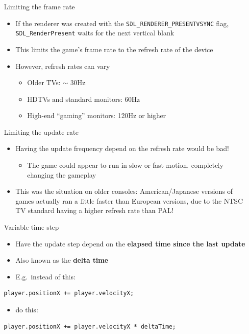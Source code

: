 \begin{frame}{Limiting the frame rate}
    \begin{itemize}
        \item If the renderer was created with the \lstinline{SDL_RENDERER_PRESENTVSYNC} flag,
            \lstinline{SDL_RenderPresent} waits for the next vertical blank \pause
        \item This limits the game's frame rate to the refresh rate of the device \pause
        \item However, refresh rates can vary \pause
            \begin{itemize}
                \item Older TVs: $\sim$ 30Hz
                \item HDTVs and standard monitors: 60Hz
                \item High-end ``gaming'' monitors: 120Hz or higher
            \end{itemize}
    \end{itemize}
\end{frame}

\begin{frame}{Limiting the update rate}
    \begin{itemize}
        \item Having the update frequency depend on the refresh rate would be bad! \pause
            \begin{itemize}
                \item The game could appear to run in slow or fast motion,
                    completely changing the gameplay \pause
            \end{itemize}
        \item This was the situation on older consoles:
            American/Japanese versions of games actually ran a little faster
            than European versions,
            due to the NTSC TV standard having a higher refresh rate than PAL!
    \end{itemize}
\end{frame}

\begin{frame}[fragile]{Variable time step}
    \begin{itemize}
        \item Have the update step depend on the \textbf{elapsed time since the last update} \pause
        \item Also known as the \textbf{delta time} \pause
        \item E.g.\ instead of this:
    \end{itemize}
    \begin{lstlisting}
player.positionX += player.velocityX;
    \end{lstlisting} \pause
    \begin{itemize}
        \item do this:
    \end{itemize}
    \begin{lstlisting}
player.positionX += player.velocityX * deltaTime;
    \end{lstlisting}
\end{frame}

